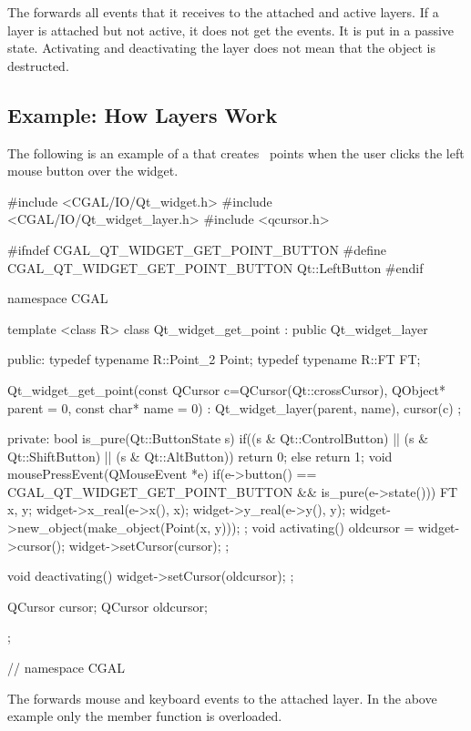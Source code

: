 
The  forwards all events that it receives to the
attached and active layers. If a layer is attached but not active, it
does not get the events. It is put in a passive state. Activating and
deactivating the layer does not mean that the object is destructed.

\subsection{Example: How Layers Work}

The following is an example of a  that creates \cgal\ points when
the user clicks the left mouse button over the widget. 
 
\begin{ccExampleCode}
#include <CGAL/IO/Qt_widget.h>
#include <CGAL/IO/Qt_widget_layer.h>
#include <qcursor.h>

#ifndef CGAL_QT_WIDGET_GET_POINT_BUTTON
#define CGAL_QT_WIDGET_GET_POINT_BUTTON Qt::LeftButton
#endif

namespace CGAL {
template <class R>
class Qt_widget_get_point : public Qt_widget_layer
{
public:
  typedef typename R::Point_2	Point;
  typedef typename R::FT	FT;
  
  Qt_widget_get_point(const QCursor c=QCursor(Qt::crossCursor),
		      QObject* parent = 0, const char* name = 0) :
    Qt_widget_layer(parent, name), cursor(c) {};
  
private:
  bool is_pure(Qt::ButtonState s){
    if((s & Qt::ControlButton) ||
       (s & Qt::ShiftButton) ||
       (s & Qt::AltButton))
      return 0;
    else
      return 1;
  }
  void mousePressEvent(QMouseEvent *e)
  {
    if(e->button() == CGAL_QT_WIDGET_GET_POINT_BUTTON
       && is_pure(e->state()))
    {
      FT x, y;
      widget->x_real(e->x(), x);
      widget->y_real(e->y(), y);
      widget->new_object(make_object(Point(x, y)));
    }
  };
  void activating()
  {
    oldcursor = widget->cursor();
    widget->setCursor(cursor);
  };
  
  void deactivating()
  {
    widget->setCursor(oldcursor);
  };

  QCursor cursor;
  QCursor oldcursor;
};
} // namespace CGAL
\end{ccExampleCode}

The  forwards mouse and keyboard events to the attached layer.
In the above example only the  member function is overloaded.

